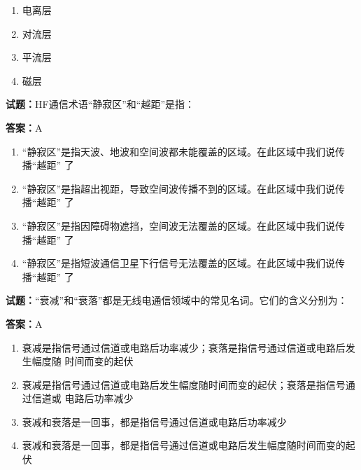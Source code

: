 \documentclass{ctexbook}
\begin{document}
\begin{enumerate}[leftmargin=3em]
  \item 电离层 

  \item 对流层 

  \item 平流层 

  \item 磁层 

\end{enumerate}





\vspace{1em}

\textbf{试题：}HF通信术语“静寂区”和“越距”是指： 

\textbf{答案：}A 

\begin{enumerate}[leftmargin=3em]
  \item “静寂区”是指天波、地波和空间波都未能覆盖的区域。在此区域中我们说传播“越距”
了 

  \item “静寂区”是指超出视距，导致空间波传播不到的区域。在此区域中我们说传播“越距”
了 

  \item “静寂区”是指因障碍物遮挡，空间波无法覆盖的区域。在此区域中我们说传播“越距”
了 

  \item “静寂区”是指短波通信卫星下行信号无法覆盖的区域。在此区域中我们说传播“越距”
了 

\end{enumerate}





\vspace{1em}

\textbf{试题：}“衰减”和“衰落”都是无线电通信领域中的常见名词。它们的含义分别为： 

\textbf{答案：}A 

\begin{enumerate}[leftmargin=3em]
  \item 衰减是指信号通过信道或电路后功率减少；衰落是指信号通过信道或电路后发生幅度随
时间而变的起伏 

  \item 衰减是指信号通过信道或电路后发生幅度随时间而变的起伏；衰落是指信号通过信道或
电路后功率减少 

  \item 衰减和衰落是一回事，都是指信号通过信道或电路后功率减少 

  \item 衰减和衰落是一回事，都是指信号通过信道或电路后发生幅度随时间而变的起伏 

\end{enumerate}
\end{document}

